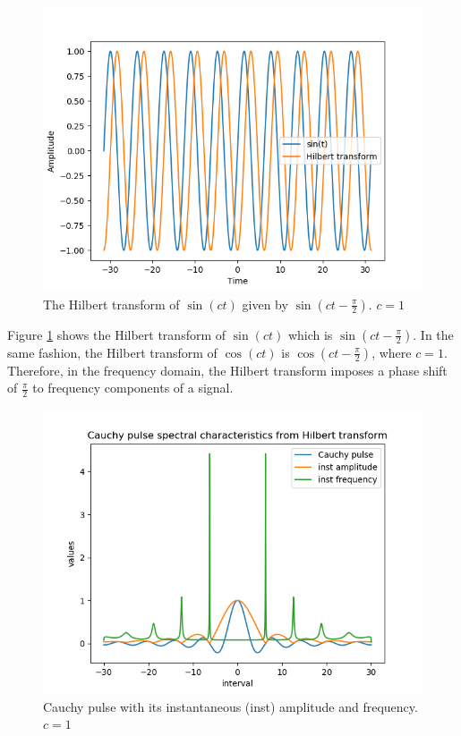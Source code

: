 \documentclass[../Main/thesis.tex]{subfiles}
\begin{document}
\begin{figure}[H]
	\centering
	\includegraphics[width=0.8\linewidth]{../fig/h_sin}
	\caption{The Hilbert transform of $\sin(ct)$ given by $\sin(ct-\frac{\pi}{2})$. $c=1$  }
	\label{fig:hsin}
\end{figure}
\justify
Figure \ref{fig:hsin} shows the Hilbert transform of $\sin(ct)$ which is $\sin\left(ct-\frac{\pi}{2}\right)$. In the same fashion, the Hilbert transform of $\cos(ct)$ is  $\cos\left(ct-\frac{\pi}{2}\right)$, where $c = 1$. Therefore, in the frequency domain, the Hilbert transform imposes a phase shift of $\frac{\pi}{2}$ to frequency components of a signal. 
\begin{figure}[H]
	\centering
	\includegraphics[width=1\linewidth]{../fig/cauchy_pulse_spectral}
	\caption{Cauchy pulse with its instantaneous (inst) amplitude and frequency. $c=1$}
	\label{fig:cauchy_pulse}
\end{figure}
\end{document}
